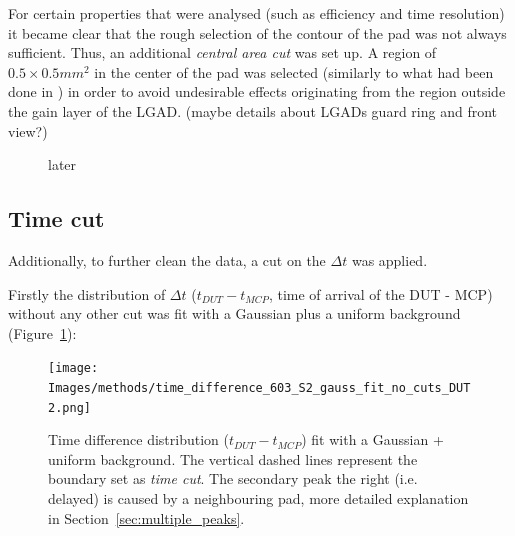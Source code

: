
For certain properties that were analysed (such as efficiency and time resolution) it became clear that the rough selection of the contour of the pad was not always sufficient. Thus, an additional \textit{central area cut} was set up. A region of \(0.5\times0.5\si{mm^2}\) in the center of the pad was selected (similarly to what had been done in \cite{Agapopoulou_2022}) in order to avoid undesirable effects originating from the region outside the gain layer of the LGAD. (maybe details about LGADs guard ring and front view?)

\begin{figure}[!ht]
    \centering
    \hfill
    \captionsetup{width=\captionwidth}
    \caption{later}
\end{figure}

\subsection{Time cut}\label{subsec:time_cut}

Additionally, to further clean the data, a cut on the $\Delta t$ was applied.

Firstly the distribution of $\Delta t$ ($t_{DUT}-t_{MCP}$, time of arrival of the DUT - MCP) without any other cut was fit with a Gaussian plus a uniform background (Figure~\ref{fig:time_cut_gauss+bg_fit}):

\begin{figure}[!ht]
    \centering
    \texttt{[image: Images/methods/time\_difference\_603\_S2\_gauss\_fit\_no\_cuts\_DUT2.png]}
    \captionsetup{width=\captionwidth}
    \caption{Time difference distribution ($t_{DUT}-t_{MCP}$) fit with a Gaussian + uniform background. The vertical dashed lines represent the boundary set as \textit{time cut}. The secondary peak 
     the right (i.e. delayed) is caused by a neighbouring pad, more detailed explanation in Section~\ref{sec:multiple_peaks}.}
    \label{fig:time_cut_gauss+bg_fit}
\end{figure}

